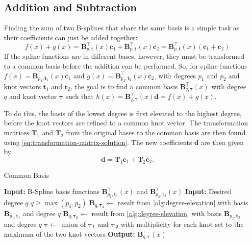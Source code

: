 \subsection{Addition and Subtraction}
Finding the sum of two B-splines that share the same basis is a simple task as their coefficients can just be added together:
\begin{equation}
    f(x) + g(x) =  \mathbf{B}_{p, \mathbf{t}}^{\top}(x) \mathbf{c}_1 + \mathbf{B}_{p, \mathbf{t}}^{\top}(x) \mathbf{c}_2
    = \mathbf{B}_{p, \mathbf{t}}^{\top}(x)(\mathbf{c}_1 + \mathbf{c}_2)
\end{equation}
If the spline functions are in different bases, however, they must be transformed to a common basis before the addition can be performed. So, for spline functions $f(x) = \mathbf{B}_{p_1, \mathbf{t}_1}^{\top}(x) \mathbf{c}_1$ and $g(x) = \mathbf{B}_{p_2, \mathbf{t}_2}^{\top}(x) \mathbf{c}_2$, with degrees $p_1$ and $p_2$ and knot vectors $\mathbf{t}_1$ and $\mathbf{t}_2$, the goal is to find a common basis $\mathbf{B}_{q, \boldsymbol{\tau}}^{\top}(x)$ with degree $q$ and knot vector $\boldsymbol{\tau}$ such that $h(x) = \mathbf{B}_{q, \boldsymbol{\tau}}^{\top}(x) \mathbf{d} = f(x) + g(x)$.

To do this, the basis of the lowest degree is first elevated to the highest degree, before the knot vectors are refined to a common knot vector. The transformation matrices $\mathbf T_1$ and $\mathbf T_2$ from the original bases to the common basis are then found using \cref{eq:transformation-matrix-solution}. The new coefficients $\mathbf d$ are then given by
\begin{equation}
    \mathbf d = \mathbf T_1 \mathbf c_1 + \mathbf T_2 \mathbf c_2.
\end{equation}

\begin{algorithm}
    \caption{Common Basis}\label{alg:common-basis}
    \begin{algorithmic}[1]
        \State \textbf{Input:} B-Spline basis functions $\mathbf{B}_{p_1, \mathbf{t}_1}^{\top}(x)$ and $\mathbf{B}_{p_2, \mathbf{t}_2}^{\top}(x)$
        \State \textbf{Input:} Desired degree $q$
        \Ensure $q \geq \max(p_1, p_2)$
        \State $\mathbf B_{q, \boldsymbol{\tau_1}} \gets$ result from \cref{alg:degree-elevation} with basis $\mathbf{B}_{p_1, \mathbf{t}_1}$ and degree $q$
        \State $\mathbf B_{q, \boldsymbol{\tau_2}} \gets$ result from \cref{alg:degree-elevation} with basis $\mathbf{B}_{p_2, \mathbf{t}_2}$ and degree $q$
        \State $\boldsymbol{\tau} \gets$ union of $\boldsymbol{\tau_1}$ and $\boldsymbol{\tau_2}$ with multiplicity for each knot set to the maximum of the two knot vectors
        \State \textbf{Output:} $\mathbf B_{q, \boldsymbol{\tau}}^{\top}(x)$
    \end{algorithmic}
\end{algorithm}



